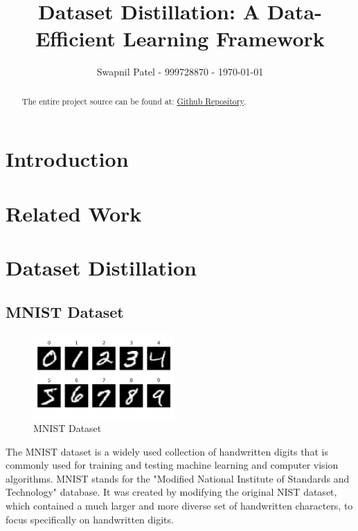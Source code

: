\documentclass[conference, compsoc]{IEEEtran}
\begin{document}
\title{Dataset Distillation: A Data-Efficient Learning Framework}
\author{Swapnil Patel - 999728870 - \today}

\author{
	}

\maketitle

\begin{abstract}
\label{sec:abstract}
The entire project source can be found at: \href{https://github.com/Swapnil949/ECE1512_2024F_ProjectRepo_SwapnilPatel}{Github Repository}.

\end{abstract}

\section{Introduction}
\label{sec:intro}



\section{Related Work}
\label{sec:related}

\section{Dataset Distillation}

\subsection{MNIST Dataset}
\begin{figure}[H]
	\centering
	\includegraphics[width=0.48\textwidth]{MNIST_dataset.png}
	\caption{MNIST Dataset \cite{deng2012mnist}}
	\label{fig:mnist_dataset}
\end{figure}
The MNIST dataset is a widely used collection of handwritten digits that is commonly used for training and testing machine learning and computer vision algorithms. MNIST stands for the "Modified National Institute of Standards and Technology" database. It was created by modifying the original NIST dataset, which contained a much larger and more diverse set of handwritten characters, to focus specifically on handwritten digits.
\end{document}
